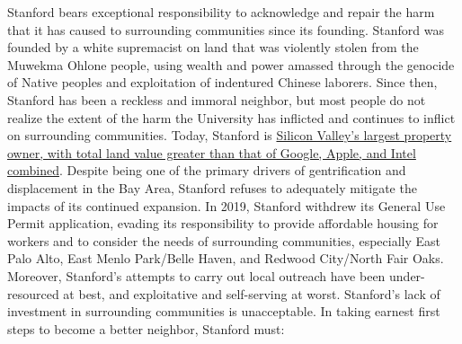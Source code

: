 \documentclass[12pt, titlepage, letterpaper]{article}
\begin{document}
Stanford bears exceptional responsibility to acknowledge and repair the harm that it has caused to surrounding communities since its founding. Stanford was founded by a white supremacist on land that was violently stolen from the Muwekma Ohlone people, using wealth and power amassed through the genocide of Native peoples and exploitation of indentured Chinese laborers. Since then, Stanford has been a reckless and immoral neighbor, but most people do not realize the extent of the harm the University has inflicted and continues to inflict on surrounding communities. Today, Stanford is \href{https://extras.mercurynews.com/whoowns/stanford.html}{Silicon Valley’s largest property owner, with total land value greater than that of Google, Apple, and Intel combined}. Despite being one of the primary drivers of gentrification and displacement in the Bay Area, Stanford refuses to adequately mitigate the impacts of its continued expansion. In 2019, Stanford withdrew its General Use Permit application, evading its responsibility to provide affordable housing for workers and to consider the needs of surrounding communities, especially East Palo Alto, East Menlo Park/Belle Haven, and Redwood City/North Fair Oaks. Moreover, Stanford’s attempts to carry out local outreach have been under-resourced at best, and exploitative and self-serving at worst. Stanford’s lack of investment in surrounding communities is unacceptable. In taking earnest first steps to become a better neighbor, Stanford must:  
\end{document}
